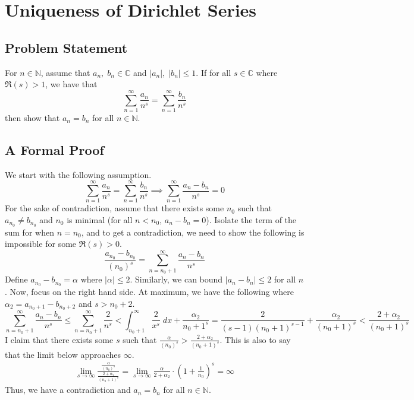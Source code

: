 
\section{Uniqueness of Dirichlet Series}
\subsection{Problem Statement}
For $n \in \mathbb{N}$, assume that $a_n, \;b_n \in \mathbb{C}$ and $|a_n|,\;|b_n| \leq 1$. If for all $s \in \mathbb{C}$ where $\Re(s) > 1$, we have that
$$
\sum_{n=1}^\infty \frac{a_n}{n^s} = \sum_{n=1}^\infty \frac{b_n}{n^s}
$$
then show that $a_n = b_n$ for all $n \in \mathbb{N}$.
\subsection{A Formal Proof}
We start with the following assumption.
$$
\sum_{n=1}^\infty \frac{a_n}{n^s} = \sum_{n=1}^\infty \frac{b_n}{n^s} \implies \sum_{n=1}^\infty \frac{a_n - b_n}{n^s} = 0
$$
For the sake of contradiction, assume that there exists some $n_0$ such that $a_{n_0} \neq b_{n_0}$ and $n_0$ is minimal (for all $n < n_0$, $a_n - b_n = 0$). Isolate the term of the sum for when $n = n_0$, and to get a contradiction, we need to show the following is impossible for some $\Re(s) > 0$.
$$
\frac{a_{n_0} - b_{n_0}}{(n_0)^s} = \sum_{n= n_0 + 1}^\infty \frac{a_n - b_n}{n^s}
$$
Define $a_{n_0} - b_{n_0} = \alpha$ where $|\alpha| \leq 2$. Similarly, we can bound $|a_n - b_n| \leq 2$ for all $n$. Now, focus on the right hand side. At maximum, we have the following where $\alpha_2 = a_{n_0+1} - b_{n_0+2}$ and $s > n_0 + 2$.
$$
\sum_{n= n_0 + 1}^\infty \frac{a_n - b_n}{n^s} \leq \sum_{n=n_0 + 1}^\infty \frac{2}{n^s} < \int_{n_0+1}^\infty \frac{2}{x^s}\;dx + \frac{\alpha_2}{{n_0+1}^s} = \frac{2}{(s-1)(n_0+1)^{s-1}} + \frac{\alpha_2}{({n_0+1})^s} < \frac{2 + \alpha_2}{(n_0+1)^{s}}
$$
I claim that there exists some $s$ such that $\frac{\alpha}{(n_0)^s} > \frac{2 + \alpha_2}{(n_0+1)^{s}}$. This is also to say that the limit below approaches $\infty$.
\begin{align*}
    \lim_{s\rightarrow\infty}\frac{\frac{\alpha}{(n_0)^s}}{\frac{2 + \alpha_2}{(n_0+1)^{s}}} = \lim_{s\rightarrow\infty}\frac{\alpha}{2+ \alpha_2} \cdot \left(1 + \frac{1}{n_0}\right)^s = \infty
\end{align*}
Thus, we have a contradiction and $a_n = b_n$ for all $n \in \mathbb{N}$. 

